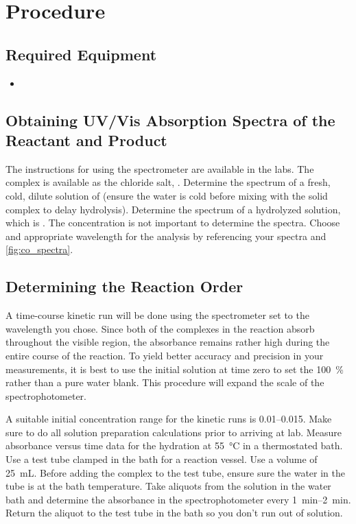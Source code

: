 \section{Procedure}
\label{sec:procedure}

\subsection{Required Equipment}
\label{subs:req_equip}

\begin{itemize}
	\item 
\end{itemize}

\subsection{Obtaining UV/Vis Absorption Spectra of the Reactant and Product}

The instructions for using the spectrometer are available in the labs. The  complex is available as the chloride salt, . Determine the spectrum of a fresh, cold, dilute solution of  (ensure the water is cold before mixing with the solid complex to delay hydrolysis). Determine the spectrum of a hydrolyzed solution, which is . The concentration is not important to determine the spectra. Choose and appropriate wavelength for the analysis by referencing your spectra and \cref{fig:co_spectra}. 

\subsection{Determining the Reaction Order} 

A time-course kinetic run will be done using the spectrometer set to the wavelength you chose. Since both of the complexes in the reaction absorb throughout the visible region, the absorbance remains rather high during the entire course of the reaction. To yield better accuracy and precision in your measurements, it is best to use the initial solution at time zero to set the \qty{100}{\percent} rather than a pure water blank. This procedure will expand the scale of the spectrophotometer. 

A suitable initial concentration range for the kinetic runs is \qtyrange{0.01}{0.015}{\Molar}. 
Make sure to do all solution preparation calculations prior to arriving at lab. 
Measure absorbance versus time data for the hydration at \qty{55}{\celsius} in a thermostated bath. 
Use a test tube clamped in the bath for a reaction vessel.
Use a volume of \qty{25}{\mL}. Before adding the complex to the test tube, ensure sure the water in the tube is at the bath temperature. 
Take aliquots from the solution in the water bath and determine the absorbance in the spectrophotometer every \qtyrange{1}{2}{\minute}. 
Return the aliquot to the test tube in the bath so you don't run out of solution. 

